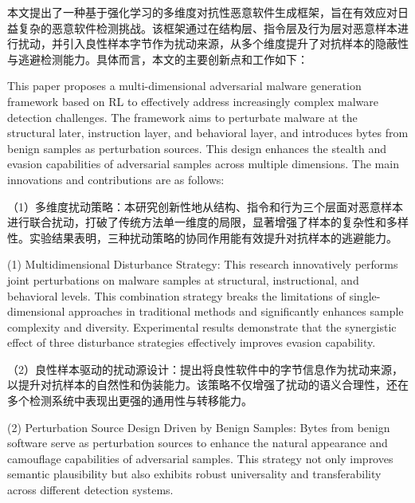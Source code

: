 %
%
%
%

\begin{conclusion}

本文提出了一种基于强化学习的多维度对抗性恶意软件生成框架，旨在有效应对日益复杂的恶意软件检测挑战。该框架通过在结构层、指令层及行为层对恶意样本进行扰动，并引入良性样本字节作为扰动来源，从多个维度提升了对抗样本的隐蔽性与逃避检测能力。具体而言，本文的主要创新点和工作如下：

This paper proposes a multi-dimensional adversarial malware generation framework based on RL to effectively address increasingly complex malware detection challenges. The framework aims to perturbate malware at the structural later, instruction layer, and behavioral layer, and introduces bytes from benign samples as perturbation sources. This design enhances the stealth and evasion capabilities of adversarial samples across multiple dimensions. The main innovations and contributions are as follows:

（1）多维度扰动策略：本研究创新性地从结构、指令和行为三个层面对恶意样本进行联合扰动，打破了传统方法单一维度的局限，显著增强了样本的复杂性和多样性。实验结果表明，三种扰动策略的协同作用能有效提升对抗样本的逃避能力。

(1) Multidimensional Disturbance Strategy: This research innovatively performs joint perturbations on malware samples at structural, instructional, and behavioral levels. This combination strategy breaks the limitations of single-dimensional approaches in traditional methods and significantly enhances sample complexity and diversity. Experimental results demonstrate that the synergistic effect of three disturbance strategies effectively improves evasion capability.

（2）良性样本驱动的扰动源设计：提出将良性软件中的字节信息作为扰动来源，以提升对抗样本的自然性和伪装能力。该策略不仅增强了扰动的语义合理性，还在多个检测系统中表现出更强的通用性与转移能力。

(2) Perturbation Source Design Driven by Benign Samples: Bytes from benign software serve as perturbation sources to enhance the natural appearance and camouflage capabilities of adversarial samples. This strategy not only improves semantic plausibility but also exhibits robust universality and transferability across different detection systems.
	

\end{conclusion}
